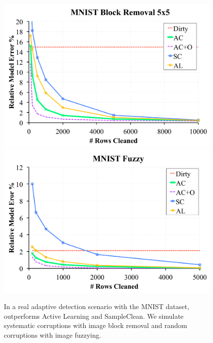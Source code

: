 \begin{figure}[ht]
\centering
 \includegraphics[width=0.49\columnwidth]{exp/exp7a.pdf}
 \includegraphics[width=0.49\columnwidth]{exp/exp7b.pdf}
 \caption{In a real adaptive detection scenario with the MNIST dataset, \sys outperforms Active Learning and SampleClean. We simulate systematic corruptions with image block removal and random corruptions with image fuzzying.  \label{mnist}}
\end{figure}
